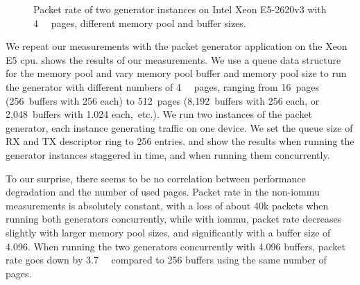 \begin{figure}%
	\centering
    \par

    \caption{Packet rate of two generator instances on Intel Xeon E5-2620v3 with
    \SI{4}{\kibi\byte} pages, different memory pool and buffer sizes.}
	\label{fig:page-size-generator}
\end{figure}

We repeat our measurements with the packet generator application on the Xeon E5
\ac{cpu}.  shows the results of our measurements.
We use a queue data structure for the memory pool and vary memory pool buffer
and memory pool size to run the generator with different numbers of
\SI{4}{\kibi\byte} pages, ranging from 16~pages (256~buffers with
\SI{256}{\byte} each) to 512~pages (8,192~buffers with \SI{256}{\byte} each, or
2,048~buffers with \SI{1,024}{\byte} each,~etc.). We run two instances of the
packet generator, each instance generating traffic on one device. We set the
queue size of RX and TX descriptor ring to 256 entries.
 and
 show the results
when running the generator instances staggered in time,
 and
 when running them
concurrently.

To our surprise, there seems to be no correlation between performance
degradation and the number of used pages. Packet rate in the non-\ac{iommu}
measurements is absolutely constant, with a loss of about 40k packets when
running both generators concurrently, while with \ac{iommu}, packet rate
decreases slightly with larger memory pool sizes, and significantly with a
buffer size of \SI{4,096}{\byte}. When running the two generators concurrently
with \SI{4,096}{\byte} buffers, packet rate goes down by \SI{3.7}{\mega\pps}
compared to \SI{256}{\byte} buffers using the same number of pages.

